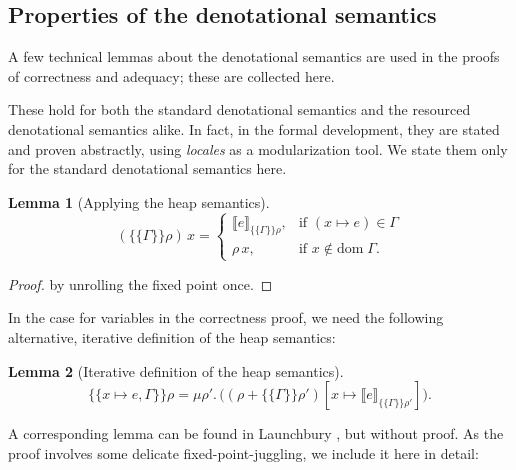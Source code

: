 \documentclass{jfp1}
\newtheorem{lemma}{Lemma}
\theoremstyle{nonumberbreak}
\newtheorem{proof}{Proof}
\newcommand{\dom}[1]{\text{dom}\;#1}
\newcommand{\dsem}[2]{\llbracket #1 \rrbracket_{#2}}
\newcommand{\esem}[1]{\{\!\!\!\{#1\}\!\!\!\}}
\newcommand{\upd}[1]{\mathop{++_{#1}}}
\begin{document}
\subsection{Properties of the denotational semantics}
\label{updsemanticsprops}

A few technical lemmas about the denotational semantics are used in the proofs of correctness and adequacy; these are collected here.

These hold for both the standard denotational semantics and the resourced denotational semantics alike. In fact, in the formal development, they are stated and proven abstractly, using \emph{locales} \cite{locales} as a modularization tool. We state them only for the standard denotational semantics here.


\begin{lemma}[Applying the heap semantics]
\[
\label{lem_esem_this}
\label{lem_esem_other}
(\esem{\Gamma}\rho)\,x =
\begin{cases}
\dsem{e}{\esem{\Gamma}\rho}, & \text{if } (x\mapsto e)\in \Gamma \\
\rho\, x, & \text{if } x \notin \dom\Gamma.
\end{cases}
\]
\end{lemma}

\begin{proof}
by unrolling the fixed point once.
\end{proof}

In the case for variables in the correctness proof, we need the following alternative, iterative definition of the heap semantics:

\begin{lemma}[Iterative definition of the heap semantics]
\[
\esem{x \mapsto e, \Gamma}\rho =
\mu \rho'.\,  \big((\rho \upd{\dom\Gamma} {\esem{\Gamma}{\rho'}})[x \mapsto \dsem{e}{\esem{\Gamma}\rho'}]\big).
\label{lem_iter}
\]
\end{lemma}

A corresponding lemma can be found in Launchbury , but without proof. As the proof involves some delicate fixed-point-juggling, we include it here in detail:
\end{document}
